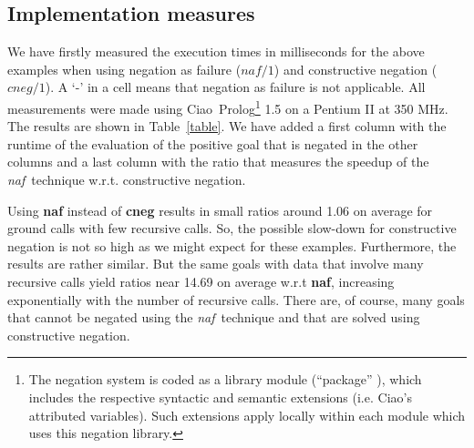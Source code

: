 \documentclass{llncs}
\newcommand{\naf}{{\em naf}}\newcommand{\viejo}[1]{}
\newcommand{\ciao}{Ciao}
\begin{document}







\subsection{Implementation measures}

We have firstly measured the execution times in milliseconds for the
above examples when using negation as failure ($naf/1$) and
constructive negation ($cneg/1$). A `-' in a cell means that negation
as failure is not applicable. All measurements were made using \ciao\
Prolog\footnote{The negation system is coded as a library module
(``package'' \cite{ciao-modules-cl2000}), which includes the
respective syntactic and semantic extensions (i.e. Ciao's
attributed variables). Such extensions apply locally within each
module which uses this negation library.} 1.5 on a Pentium II at 350
MHz. The results are shown in Table~\ref{table}. We have added a first
column with the runtime of the evaluation of the positive goal that is
negated in the other columns and a last column with the ratio that
measures the speedup of the \naf\ technique w.r.t. constructive
negation.

Using {\bf naf} instead of {\bf cneg} results in small ratios around
1.06 on average for ground calls with few recursive calls. So, the
possible slow-down for constructive negation is not so high as we
might expect for these examples. Furthermore, the results are rather
similar. But the same goals with data that involve many recursive
calls yield ratios near 14.69 on average w.r.t {\bf naf},
increasing exponentially with the number of recursive calls. There
are, of course, many goals that cannot be negated using the \naf\
technique and that are solved using constructive negation.

 
\end{document}
